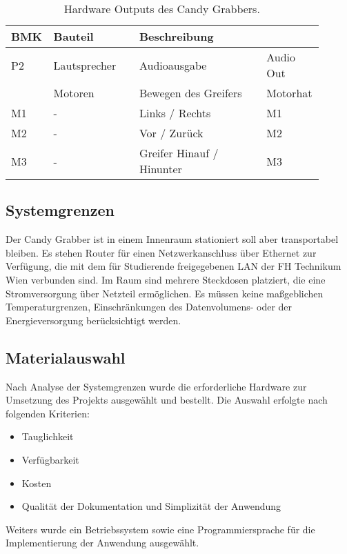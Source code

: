 \documentclass[BMR,Bachelor,ngerman]{twbook}%
\begin{document}
\begin{table}
\caption{Hardware Outputs des Candy Grabbers.}\label{tab:Os}
\begin{tabular}{| p{0.08\linewidth} | p{0.27\linewidth} | p{0.4\linewidth} | p{0.15\linewidth} |}\hline
\rowcolor[gray]{0.8} BMK & Bauteil & Beschreibung & \\\hline
P2 & Lautsprecher & Audioausgabe & Audio Out\\\hline
 & Motoren & Bewegen des Greifers& Motorhat\\
 M1 & - & Links / Rechts & M1\\
 M2 & - & Vor / Zurück & M2\\
 M3 & - & Greifer Hinauf / Hinunter & M3\\\hline
\end{tabular}
\end{table}
%
\subsection{Systemgrenzen}
Der Candy Grabber ist in einem Innenraum stationiert soll aber transportabel bleiben. Es stehen Router für einen Netzwerkanschluss über Ethernet zur Verfügung, die mit dem für Studierende freigegebenen \ac{LAN} der FH Technikum Wien verbunden sind. Im Raum sind mehrere Steckdosen platziert, die eine Stromversorgung über Netzteil ermöglichen. Es müssen keine maßgeblichen Temperaturgrenzen, Einschränkungen des Datenvolumens- oder der Energieversorgung berücksichtigt werden. 
%
\subsection{Materialauswahl}
Nach Analyse der Systemgrenzen wurde die erforderliche Hardware zur Umsetzung des Projekts ausgewählt und bestellt. Die Auswahl erfolgte nach folgenden Kriterien: 
\begin{itemize}
	\item{Tauglichkeit}
	\item{Verfügbarkeit}
	\item{Kosten}
	\item{Qualität der Dokumentation und Simplizität der Anwendung}
\end{itemize}
Weiters wurde ein Betriebssystem sowie eine Programmiersprache für die Implementierung der Anwendung ausgewählt.
\end{document}
